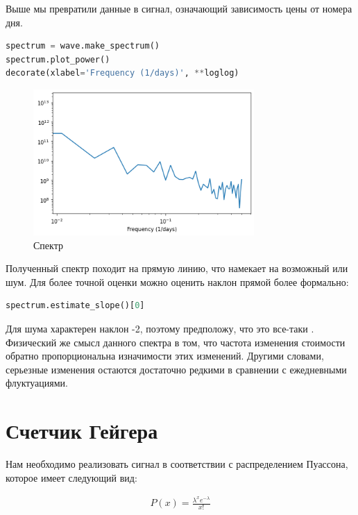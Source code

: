 \documentclass[a4paper,12pt]{report}
\begin{document}
    Выше мы превратили данные в сигнал, означающий зависимость цены от номера дня.
    
\begin{lstlisting}[language=Python,caption=Спектр]
spectrum = wave.make_spectrum()
spectrum.plot_power()
decorate(xlabel='Frequency (1/days)', **loglog)
\end{lstlisting}

    \begin{figure}[H]
        \centering
        \includegraphics[width=0.75\textwidth]{ex3_spectrum}
        \caption{Спектр}
        \label{fig:ex3_spectrum}
    \end{figure}
    
    Полученный спектр походит на прямую линию, что намекает на возможный  или  шум. Для более точной оценки можно оценить наклон прямой более формально:
    
\begin{lstlisting}[language=Python,caption=Спектр]
spectrum.estimate_slope()[0]
\end{lstlisting}

    Для  шума характерен наклон -2, поэтому предположу, что это все-таки . Физический же смысл данного спектра в том, что частота изменения стоимости обратно пропорциональна изначимости этих изменений. Другими словами, серьезные изменения остаются достаточно редкими в сравнении с ежедневными флуктуациями.
    
    \chapter{Счетчик Гейгера}
    
    Нам необходимо реализовать сигнал в соответствии с распределением Пуассона, которое имеет следующий вид:
    
    \[
        \begin{aligned}
            P(x) = \frac{\lambda^x e^{-\lambda}}{x!}
        \end{aligned}
    \]
    
\end{document}
